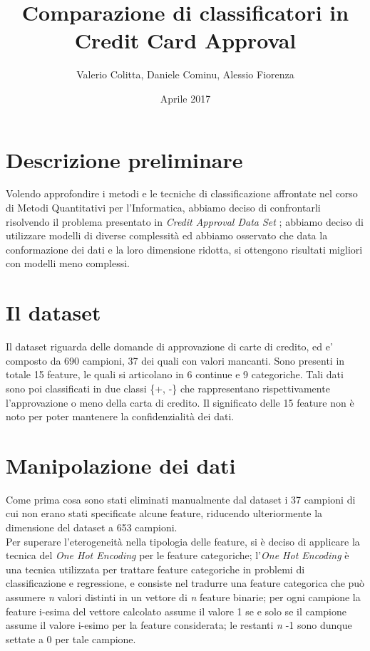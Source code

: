 \documentclass[a4paper,8pt]{article}
\begin{document}
\title{Comparazione di classificatori in Credit Card Approval}
\author{Valerio Colitta, Daniele Cominu, Alessio Fiorenza}
\date{Aprile 2017}
\maketitle

\begin{multicols}{2}

\section{Descrizione preliminare}
Volendo approfondire i metodi e le tecniche di classificazione affrontate nel corso di Metodi Quantitativi per l'Informatica, abbiamo deciso di confrontarli risolvendo il problema presentato in \emph{Credit Approval Data Set} \cite{Dataset}; abbiamo deciso di utilizzare modelli di diverse complessità ed abbiamo osservato che data la conformazione dei dati e la loro dimensione ridotta, si ottengono risultati migliori con modelli meno complessi. 

\section{Il dataset}
Il dataset riguarda delle domande di approvazione di carte di credito, ed e' composto da 690 campioni, 37 dei quali con valori mancanti. Sono presenti in totale 15 feature, le quali si articolano in 6 continue e 9 categoriche. Tali dati sono poi classificati in due classi \{+, -\} che rappresentano rispettivamente l'approvazione o meno della carta di credito.
Il significato delle 15 feature non è noto per poter mantenere la confidenzialità dei dati.

\section{Manipolazione dei dati}
Come prima cosa sono stati eliminati manualmente dal dataset i 37 campioni di cui non erano stati specificate alcune feature, riducendo ulteriormente la dimensione del dataset a 653 campioni.\\
Per superare l'eterogeneità nella tipologia delle feature, si è deciso di applicare la tecnica del \emph{One Hot Encoding} \cite{OneHotEncoding} per le feature categoriche; l'\emph{One Hot Encoding} è una tecnica utilizzata per trattare feature categoriche in problemi di classificazione e regressione, e consiste nel tradurre una feature categorica che può assumere \emph{n} valori distinti in un vettore di \emph{n} feature binarie; per ogni campione la feature i-esima del vettore calcolato assume il valore 1 se e solo se il campione assume il valore i-esimo per la feature considerata; le restanti \emph{n} -1 sono dunque settate a 0 per tale campione.


\end{multicols}
\end{document}
